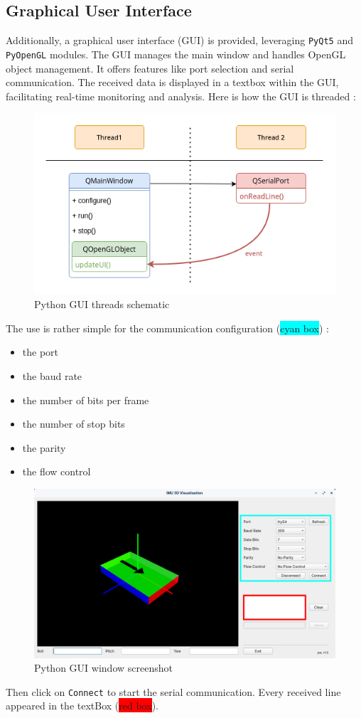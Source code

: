 \subsection{Graphical User Interface}
Additionally, a graphical user interface (GUI) is provided, leveraging \texttt{PyQt5}\cite{pyqt5} and \texttt{PyOpenGL}\cite{pyopengl} modules. The GUI manages the main window and handles OpenGL object management. It offers features like port selection and serial communication. The received data is displayed in a textbox within the GUI, facilitating real-time monitoring and analysis.
Here is how the GUI is threaded :
\begin{figure}[H]
    \centering
    \includegraphics[width=0.65\linewidth]{./projects/pmodnav/gui_threads.png}
    \caption{Python GUI threads schematic}
\end{figure}
The use is rather simple for the communication configuration (\colorbox{cyan}{cyan box}) :
\begin{itemize}
    \item the port
    \item the baud rate
    \item the number of bits per frame
    \item the number of stop bits
    \item the parity
    \item the flow control
\end{itemize}
\begin{figure}[H]
    \centering
    \includegraphics[width=0.65\linewidth]{./projects/pmodnav/gui_window.png}
    \caption{Python GUI window screenshot}
\end{figure}
Then click on \texttt{Connect} to start the serial communication. Every received line appeared in the textBox (\colorbox{red}{red box}).


